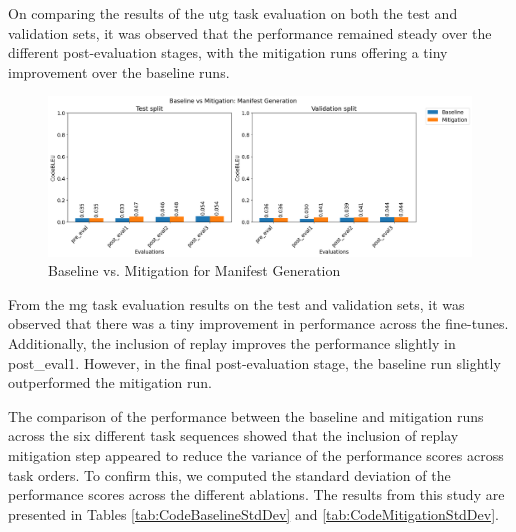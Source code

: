 
On comparing the results of the utg task evaluation on both the test and validation sets, it was observed that the performance remained steady over the different post-evaluation stages, with the mitigation runs offering a tiny improvement over the baseline runs. 

\begin{figure}[H]
    \centering
    \includegraphics[width=1.2\textwidth]{Figures/results/code_comparisons/task_eval/comparison_task_mg.png} 
    \caption{Baseline vs. Mitigation for Manifest Generation}
    \label{fig:MGComparison}
\end{figure}


From the mg task evaluation results on the test and validation sets, it was observed that there was a tiny improvement in performance across the fine-tunes. Additionally, the inclusion of replay improves the performance slightly in post\_eval1. However, in the final post-evaluation stage, the baseline run slightly outperformed the mitigation run.

The comparison of the performance between the baseline and mitigation runs across the six different task sequences showed that the inclusion of replay mitigation step appeared to reduce the variance of the performance scores across task orders. To confirm this, we computed the standard deviation of the performance scores across the different ablations. The results from this study are presented in Tables \ref{tab:CodeBaselineStdDev} and \ref{tab:CodeMitigationStdDev}.



